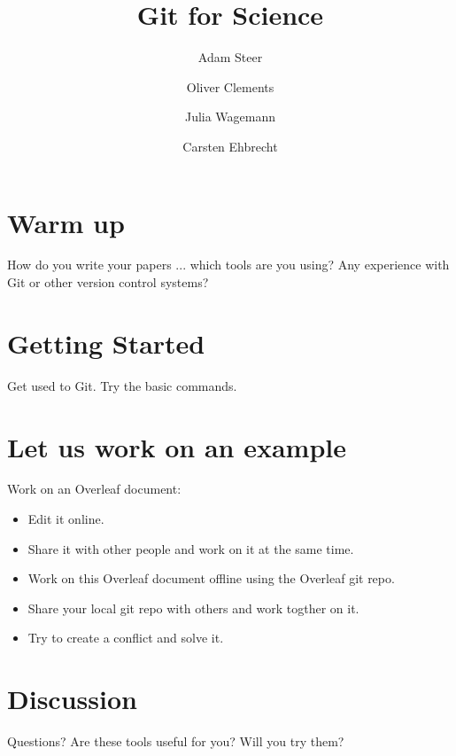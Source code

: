 \documentclass[fleqn,10pt]{wlscirep}
\title{Git for Science}
\author[1,*]{Adam Steer}
\author[2]{Oliver Clements}
\author[2]{Julia Wagemann}
\author[3]{Carsten Ehbrecht}
\affil[1]{NCI, Australia}
\affil[2]{PML, UK}
\affil[3]{DKRZ, Germany}
\begin{document}
\flushbottom
\maketitle

\thispagestyle{empty}

\section*{Warm up}

How do you write your papers ... which tools are you using? Any experience with Git or other version control systems?

\section*{Getting Started}

Get used to Git. Try the basic commands.

\section*{Let us work on an example}

Work on an Overleaf document:

\begin{itemize}
  \item Edit it online.
  \item Share it with other people and work on it at the same time.
  \item Work on this Overleaf document offline using the Overleaf git repo.
  \item Share your local git repo with others and work togther on it.
  \item Try to create a conflict and solve it.
\end{itemize}

\section*{Discussion}

Questions? Are these tools useful for you? Will you try them?
\end{document}
